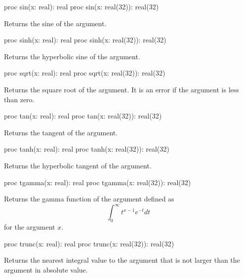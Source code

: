 \begin{protohead}
proc sin(x: real): real
proc sin(x: real(32)): real(32)
\end{protohead}
\begin{protobody}
Returns the sine of the argument.
\end{protobody}

\begin{protohead}
proc sinh(x: real): real
proc sinh(x: real(32)): real(32)
\end{protohead}
\begin{protobody}
Returns the hyperbolic sine of the argument.
\end{protobody}

\begin{protohead}
proc sqrt(x: real): real
proc sqrt(x: real(32)): real(32)
\end{protohead}
\begin{protobody}
Returns the square root of the argument.  It is an error if the
argument is less than zero.
\end{protobody}

\begin{protohead}
proc tan(x: real): real
proc tan(x: real(32)): real(32)
\end{protohead}
\begin{protobody}
Returns the tangent of the argument.
\end{protobody}

\begin{protohead}
proc tanh(x: real): real
proc tanh(x: real(32)): real(32)
\end{protohead}
\begin{protobody}
Returns the hyperbolic tangent of the argument.
\end{protobody}

\begin{protohead}
proc tgamma(x: real): real
proc tgamma(x: real(32)): real(32)
\end{protohead}
\begin{protobody}
Returns the gamma function of the argument defined as
$$\int_0^\infty t^{x-1} e^{-t} dt$$
for the argument $x$.
\end{protobody}

\begin{protohead}
proc trunc(x: real): real
proc trunc(x: real(32)): real(32)
\end{protohead}
\begin{protobody}
Returns the nearest integral value to the argument that is not larger
than the argument in absolute value.
\end{protobody}


